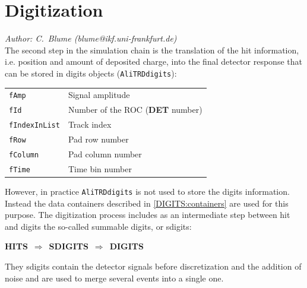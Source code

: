\documentclass{alicetdr}
\begin{document}
\section{Digitization}
%
{\it Author: C.~Blume (blume@ikf.uni-frankfurt.de)}
\smallskip
\\
%
The second step in the simulation chain is the translation of the hit information,
i.e. position and amount of deposited charge, into the final detector response
that can be stored in digits objects ({\tt AliTRDdigits}):
%
\begin{center}
\begin{tabular}{ll}
{\tt fAmp}         & Signal amplitude                      \\
{\tt fId}          & Number of the ROC ({\bf DET} number)  \\
{\tt fIndexInList} & Track index                           \\
{\tt fRow}         & Pad row number                        \\
{\tt fColumn}      & Pad column number                     \\
{\tt fTime}        & Time bin number                       \\
\end{tabular}
\end{center}
%
However, in practice {\tt AliTRDdigits} is not used to store the digits
information.  Instead the data containers described in \ref{DIGITS:containers}
are used for this purpose.  The digitization process includes as an
intermediate step between hit and digits the so-called summable digits, or
sdigits:
\begin{center}
\mbox{{\bf HITS} $\Longrightarrow$ {\bf SDIGITS} $\Longrightarrow$ {\bf DIGITS}}
\end{center}
They sdigits contain the detector signals before discretization and the addition
of noise and are used to merge several events into a single one.
%
\end{document}
